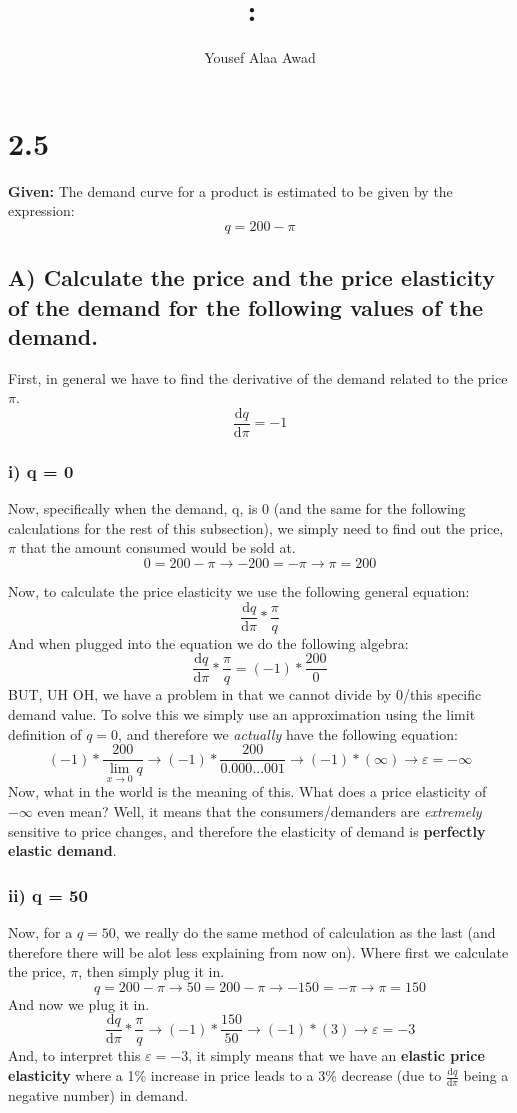 \documentclass{article}
\title{
    \vspace{2in}
    \textmd{\textbf{\hmwkClass:\ \hmwkTitle}}\\
    \normalsize\vspace{0.1in}
    \vspace{3in}
}
\author{Yousef Alaa Awad}
\begin{document}
\maketitle
\pagebreak

\section{2.5}
\textbf{Given:}  The demand curve for a product is estimated to be given by the expression: $$ q = 200 - \pi $$

\subsection{A) Calculate the price and the price elasticity of the demand for the following values of the demand.}
First, in general we have to find the derivative of the demand related to the price $\pi$.
$$ \frac{\text{d}q}{\text{d}\pi} = -1$$

\subsubsection{i) q = 0}
Now, specifically when the demand, q, is 0 (and the same for the following calculations for the rest of this subsection), we simply need to find out the price, $\pi$ that the amount consumed would be sold at.
$$ 0 = 200 - \pi \rightarrow -200 = -\pi \rightarrow \pi = 200 $$

Now, to calculate the price elasticity we use the following general equation:
$$ \frac{\text{d}q}{\text{d}\pi}*\frac{\pi}{q} $$
And when plugged into the equation we do the following algebra:
$$ \frac{\text{d}q}{\text{d}\pi}*\frac{\pi}{q} = (-1)*\frac{200}{0} $$
BUT, UH OH, we have a problem in that we cannot divide by 0/this specific demand value. To solve this we simply use an approximation using the limit definition of $q=0$, and therefore we \textit{actually} have the following equation:
$$ (-1)*\frac{200}{\lim_{x \to 0} q} \rightarrow (-1)*\frac{200}{0.000...001} \rightarrow (-1)*(\infty) \rightarrow \varepsilon = -\infty $$
Now, what in the world is the meaning of this. What does a price elasticity of $-\infty$ even mean? Well, it means that the consumers/demanders are \textit{extremely} sensitive to price changes, and therefore the elasticity of demand is \textbf{perfectly elastic demand}.

\subsubsection{ii) q = 50}
Now, for a $q=50$, we really do the same method of calculation as the last (and therefore there will be alot less explaining from now on). Where first we calculate the price, $\pi$, then simply plug it in.
$$ q = 200 - \pi \rightarrow 50 = 200 - \pi \rightarrow -150 = -\pi \rightarrow \pi = 150 $$
And now we plug it in.
$$ \frac{\text{d}q}{\text{d}\pi}*\frac{\pi}{q} \rightarrow (-1)*\frac{150}{50} \rightarrow (-1)*(3) \rightarrow \varepsilon = -3 $$
And, to interpret this $\varepsilon = -3$, it simply means that we have an \textbf{elastic price elasticity} where a 1\% increase in price leads to a 3\% decrease (due to $\frac{\text{d}q}{\text{d}\pi}$ being a negative number) in demand.
\end{document}
